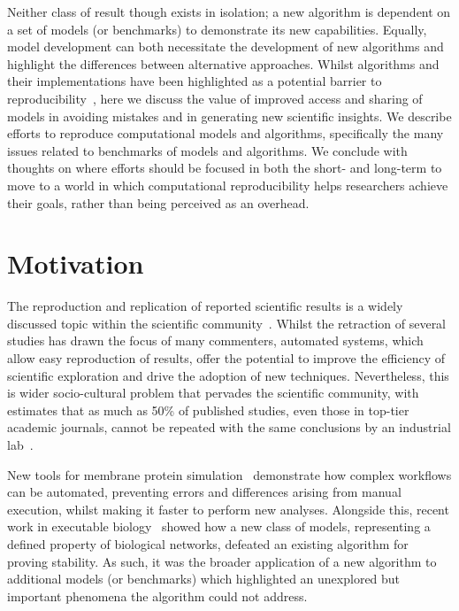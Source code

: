 \documentclass[conference]{IEEEtran}
\begin{document}
Neither class of result though exists in isolation; a new algorithm is
dependent on a set of models (or benchmarks) to demonstrate its new
capabilities. Equally, model development can both necessitate the
development of new algorithms and highlight the differences between
alternative approaches. Whilst algorithms and their implementations
have been highlighted as a potential barrier to
reproducibility~\cite{crick-et-al_wssspe2}, here we discuss the value
of improved access and sharing of models in avoiding mistakes and in
generating new scientific insights. We describe efforts to reproduce
computational models and algorithms, specifically the many issues
related to benchmarks of models and algorithms. We conclude with
thoughts on where efforts should be focused in both the short- and
long-term to move to a world in which computational reproducibility
helps researchers achieve their goals, rather than being perceived as
an overhead.


\section{Motivation}
The reproduction and replication of reported scientific results is a
widely discussed topic within the scientific
community~\cite{barnes:2010,morin-et-al:2012,joppa-et-al:2013}.
Whilst the retraction of several studies has drawn the focus of many
commenters, automated systems, which allow easy reproduction of
results, offer the potential to improve the efficiency of scientific
exploration and drive the adoption of new techniques. Nevertheless,
this is wider socio-cultural problem that pervades the scientific
community, with estimates that as much as 50\% of published studies,
even those in top-tier academic journals, cannot be repeated with the
same conclusions by an industrial lab~\cite{osherovich:2011}.

New tools for membrane protein simulation~\cite{Stansfeld,Hall2014}
demonstrate how complex workflows can be automated, preventing errors
and differences arising from manual execution, whilst making it faster
to perform new analyses.  Alongside this, recent work in executable
biology~\cite{Cook} showed how a new class of models, representing a
defined property of biological networks, defeated an existing
algorithm for proving stability. As such, it was the broader
application of a new algorithm to additional models (or benchmarks)
which highlighted an unexplored but important phenomena the algorithm
could not address.
\end{document}
